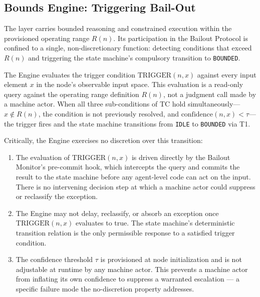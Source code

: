 \subsection{Bounds Engine: Triggering Bail-Out}\label{sec:bounds-trigger}

The \bounds{} layer carries bounded reasoning and constrained execution within
the provisioned operating range $R(n)$.  Its participation in the Bailout
Protocol is confined to a single, non-discretionary function: detecting
conditions that exceed $R(n)$ and triggering the state machine's compulsory
transition to \texttt{BOUNDED}.

The \bounds{} Engine evaluates the trigger condition $\text{TRIGGER}(n,x)$
against every input element $x$ in the node's observable input space.  This
evaluation is a read-only query against the operating range definition $R(n)$,
not a judgment call made by a machine actor.  When all three sub-conditions of
TC hold simultaneously---$x \notin R(n)$, the condition is not previously
resolved, and $\text{confidence}(n,x) < \tau$---the trigger fires and the state
machine transitions from \texttt{IDLE} to \texttt{BOUNDED} via T1.

Critically, the \bounds{} Engine exercises no discretion over this transition:

\begin{enumerate}\itemsep=0pt
\item The evaluation of $\text{TRIGGER}(n,x)$ is driven directly by the Bailout
Monitor's pre-commit hook, which intercepts the query and commits the result to
the state machine before any agent-level code can act on the input.  There is
no intervening decision step at which a machine actor could suppress or
reclassify the exception.

\item The \bounds{} Engine may not delay, reclassify, or absorb an exception
once $\text{TRIGGER}(n,x)$ evaluates to true.  The state machine's deterministic
transition relation is the only permissible response to a satisfied trigger
condition.

\item The confidence threshold $\tau$ is provisioned at node initialization and
is not adjustable at runtime by any machine actor.  This prevents a machine
actor from inflating its own confidence to suppress a warranted escalation ---
a specific failure mode the no-discretion property addresses.
\end{enumerate}


